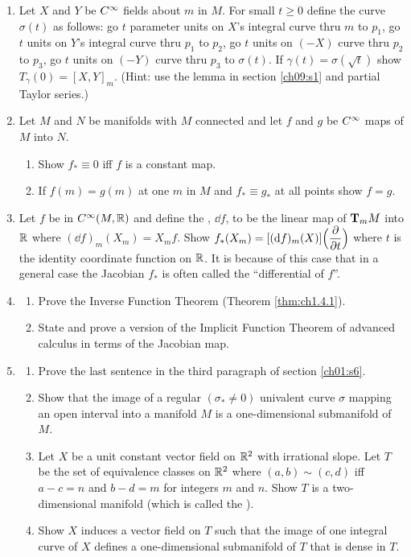 \documentclass[../main]{subfiles}
\begin{document}
\begin{enumerate}
\item\label{pro:13}
Let $X$ and $Y$ be $\CInfty$ fields about $m$ in $M$. For small $t \ge 0$ define the curve $\sigma(t)$ as follows: go $t$ parameter units on $X$'s integral curve thru $m$ to $p_1$, go $t$ units on $Y$'s integral curve thru $p_1$ to $p_2$, go $t$ units on $(-X)$ curve thru $p_2$ to $p_3$, go $t$ units on $(-Y)$ curve thru $p_3$ to $\sigma(t)$. If $\gamma(t) = \sigma(\sqrt{t})$ show $T_\gamma (0) = [X,Y]_m$. (Hint: use the lemma in section \ref{ch09:s1} and partial Taylor series.)


\item\label{pro:14} Let $M$ and $N$ be manifolds with $M$ connected and let $f$ and $g$ be $\CInfty$ maps of $M$ into $N$. 
\begin{enumerate}[label = (\roman*)]
    \item Show $f_* \equiv 0$ iff $f$ is a constant map.
    \item If $f(m) = g(m)$ at one $m$ in $M$ and $f_* \equiv g_*$ at all points show $f=g$.
\end{enumerate} 


\item\label{pro:15} Let $f$ be in $\CInfty(M,\bR)$ and define the , $\dd f$, to be the linear map of $\tangentspace{M}{m}$ into $\bR$ where $(\dd f)_m (X_m) = X_m f$. Show \newline $f_* (X_m) = [(\dd f)_m (X)]\Big(\pdv{}{t}\Big)$ where $t$ is the identity coordinate function on $\bR$. It is because of this case that in a general case the Jacobian $f_*$ is often called the ``differential of $f$''.


\item\label{pro:16}
\begin{enumerate}[label=(\roman{enumii})]
    \item Prove the Inverse Function Theorem (Theorem \ref{thm:ch1.4.1}).
    \item  State and prove a version of the Implicit Function Theorem of advanced calculus in terms of the Jacobian map.
\end{enumerate} 


\item\label{pro:17} \begin{enumerate}[label=(\roman{enumii})]
    \item Prove the last sentence in the third paragraph of section \ref{ch01:s6}. 
    \item Show that the image of a regular $(\sigma_* \ne 0)$ univalent curve $\sigma$ mapping an open interval into a manifold $M$ is a one-dimensional submanifold of $M$.
    \item Let $X$ be a unit constant vector field on $\bR^2$ with irrational slope. Let $T$ be the set of equivalence classes on $\bR^2$ where $(a,b) \sim (c, d)$ iff $a-c = n$ and $b-d = m$ for integers $m$ and $n$. Show $T$ is a two-dimensional manifold (which is called the ).
    \item Show $X$ induces a vector field on $T$ such that the image of one integral curve of $X$ defines a one-dimensional submanifold of $T$ that is dense in $T$.
\end{enumerate}



\end{enumerate}
\end{document}
